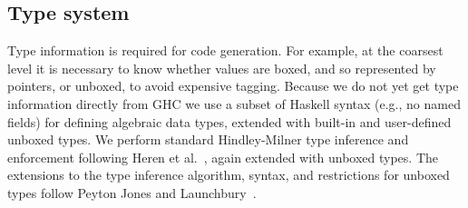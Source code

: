 \documentclass{llncs}
\begin{document}
\begin{comment}
For \emph{direct calls}, in which a known function is applied
to a number of arguments equal to its arity, \emph{stgApply} need not be
invoked: the \emph{FUN} is tail-called directly.


In addition to being in a tail call position, the GCC constraints for
generating a tail call (jump) are (approximately) that the total size of the
caller and callee arguments be equal, and the return type sizes be equal.  For
Clang the requirement is slightly more strict: caller and callee type
signatures must be the same.  These are a consequence of the C calling
convention that the caller, not callee, cleans up the stack (removes the
callee's stack frame).  However, because we maintain our own stack we can
define our own calling convention(s), so tail calls can be made to functions
of notionally differing type.  In particular, top-of-stack frames can be
adjusted in size and content without undue copying.
\end{comment}

\subsection{Type system}

Type information is required for code generation.  For example, at the
coarsest level it is necessary to know whether values are boxed, and so
represented by pointers, or unboxed, to avoid expensive tagging.  Because we
do not yet get type information directly from GHC we use a subset of Haskell
syntax (e.g., no named fields) for defining algebraic data types, extended
with built-in and user-defined unboxed types.  We perform standard
Hindley-Milner type inference and enforcement following Heren et
al.~\cite{Heren02}, again extended with unboxed types.  The extensions to the
type inference algorithm, syntax, and restrictions for unboxed types follow
Peyton Jones and Launchbury~\cite{Jones:1991}.
\begin{comment}
For convenience general recursive
\texttt{let}s are implicitly factored in the usual way to maximize let-polymorphism;
this would normally already be performed by a front-end.
\end{comment}
\begin{comment}
One would expect an automated STG generator such as GHC to factor recursive
\texttt{let} expressions into nested recursive and non-recursive \texttt{let}s
in the usual way to maximize let-polymorphism.  Because our STG is intended
to be somewhat convenient to write by hand we relax this constraint and perform
this transformation implicitly using a strongly-connected components algorithm
inspired by King and Launchbury~\cite{King:1995}.
\end{comment}
\end{document}
